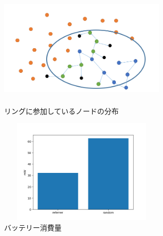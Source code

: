 \documentclass[a4paper, twocolumn]{jarticle}
\begin{document}
\begin{figure}[htbp]
	\begin{minipage}{0.5\hsize}
		\begin{center}
		\includegraphics[width=8cm, height=5cm]{ring_struct_failed.png}
		\end{center}
		\caption{リングに参加しているノードの分布}\label{fig:ring_struct}
	\end{minipage}
		\begin{minipage}{0.5\hsize}
		\begin{center}
		\includegraphics[width=8cm, height=5cm]{battery_eval_2.png}
		\end{center}
		\caption{バッテリー消費量}\label{fig:battery_eval}
	\end{minipage}
\end{figure}

\end{document}
